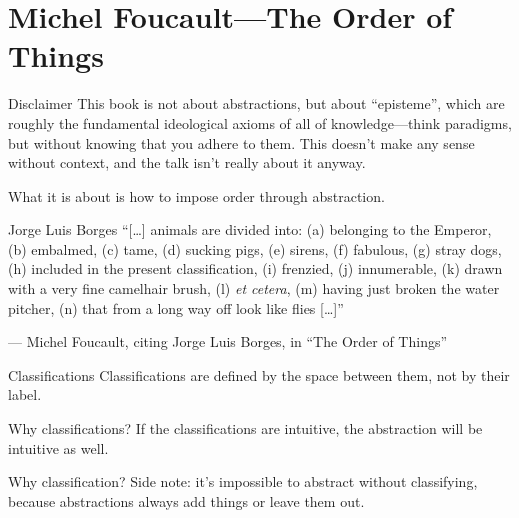 \documentclass[aspectratio=169]{beamer}
\begin{document}
  \section{Michel Foucault—The Order of Things}
  \begin{frame}{Disclaimer}
    This book is not about abstractions, but about “episteme”, which are roughly
    the fundamental ideological axioms of all of knowledge—think paradigms, but
    without knowing that you adhere to them. This doesn’t make any sense
    without context, and the talk isn’t really about it anyway.

    What it is about is how to impose order through abstraction.
  \end{frame}
  \begin{frame}{Jorge Luis Borges}
    “[\ldots] animals are divided into: (a) belonging to the Emperor, (b)
    embalmed, (c) tame, (d) sucking pigs, (e) sirens, (f) fabulous, (g) stray
    dogs, (h) included in the present classification, (i) frenzied, (j)
    innumerable, (k) drawn with a very fine camelhair brush, (l) \textit{et
    cetera}, (m) having just broken the water pitcher, (n) that from a long
    way off look like flies [\ldots]”

    — Michel Foucault, citing Jorge Luis Borges, in “The Order of Things”
  \end{frame}
  \begin{frame}{Classifications}
    Classifications are defined by the space between them, not by their label.
  \end{frame}
  \begin{frame}{Why classifications?}
    If the classifications are intuitive, the abstraction will be intuitive as
    well.
  \end{frame}
  \begin{frame}{Why classification?}
    Side note: it’s impossible to abstract without classifying, because
    abstractions always add things or leave them out.
  \end{frame}
\end{document}
